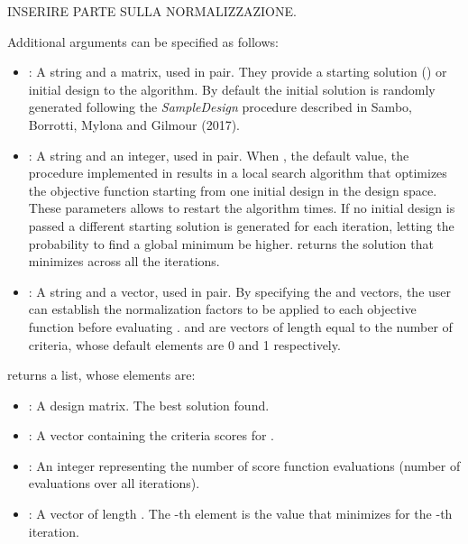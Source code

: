 \documentclass[a4paper]{book}
\begin{document}
%
\begin{Details}\relax
INSERIRE PARTE SULLA NORMALIZZAZIONE.

Additional arguments can be specified as follows:
\begin{itemize}

\item{} : A string and a matrix, used in pair. They provide
a starting solution () or initial design to the algorithm. By
default the initial solution is randomly generated following the
\emph{SampleDesign} procedure described in Sambo, Borrotti, Mylona and Gilmour
(2017).

\item{} : A string and an integer, used in pair. When
, the default value, the procedure implemented in 
results in a local search algorithm that optimizes the objective function
 starting from one initial design in the design space. These
parameters allows to restart the algorithm  times. If no initial design
is passed a different starting solution is generated for each iteration, letting
the probability to find a global minimum be higher.  returns
the solution that minimizes  across all the  iterations.

\item{} : A string and a vector, used in
pair. By specifying the  and  vectors, the user can
establish the normalization factors to be applied to each objective function
before evaluating .  and  are vectors of
length equal to the number of criteria, whose default elements are 0 and 1
respectively.

\end{itemize}

\end{Details}
%
\begin{Value}
 returns a list, whose elements are:
\begin{itemize}

\item{} : A design matrix. The best solution found.
\item{} : A vector containing the criteria scores for
.
\item{} : An integer representing the number of score function
evaluations (number of  evaluations over all iterations).
\item{} : A vector of length . The -th element is
the value that minimizes  for the -th iteration.

\end{itemize}

\end{Value}
\end{document}
